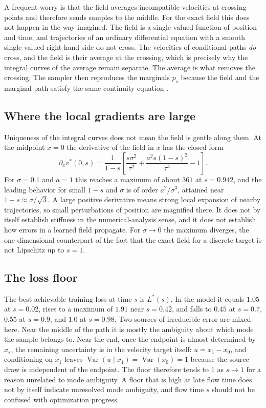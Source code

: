 \documentclass[11pt]{article}
\theoremstyle{definition}
\newcommand{\Var}{\operatorname{Var}}
\begin{document}
A frequent worry is that the field averages incompatible velocities at crossing points and therefore sends samples to the middle. For the exact field this does not happen in the way imagined. The field is a single-valued function of position and time, and trajectories of an ordinary differential equation with a smooth single-valued right-hand side do not cross. The velocities of conditional paths \emph{do} cross, and the field is their average at the crossing, which is precisely why the integral curves of the average remain separate. The average is what removes the crossing. The sampler then reproduces the marginals $p_s$ because the field and the marginal path satisfy the same continuity equation \citep{lipman2023}.

\subsection{Where the local gradients are large}

Uniqueness of the integral curves does not mean the field is gentle along them. At the midpoint $x=0$ the derivative of the field in $x$ has the closed form
\[
\partial_x v^\ast(0,s)=\frac{1}{1-s}\left[\frac{s\sigma^2}{\tau^2}+\frac{a^2 s(1-s)^2}{\tau^4}-1\right].
\]
For $\sigma=0.1$ and $a=1$ this reaches a maximum of about $361$ at $s=0.942$, and the leading behavior for small $1-s$ and $\sigma$ is of order $a^2/\sigma^3$, attained near $1-s\approx\sigma/\sqrt3$. A large positive derivative means strong local expansion of nearby trajectories, so small perturbations of position are magnified there. It does not by itself establish stiffness in the numerical-analysis sense, and it does not establish how errors in a learned field propagate. For $\sigma\to0$ the maximum diverges, the one-dimensional counterpart of the fact that the exact field for a discrete target is not Lipschitz up to $s=1$.

\subsection{The loss floor}

The best achievable training loss at time $s$ is $L^\ast(s)$. In the model it equals $1.05$ at $s=0.02$, rises to a maximum of $1.91$ near $s=0.42$, and falls to $0.45$ at $s=0.7$, $0.55$ at $s=0.9$, and $1.0$ at $s=0.98$. Two sources of irreducible error are mixed here. Near the middle of the path it is mostly the ambiguity about which mode the sample belongs to. Near the end, once the endpoint is almost determined by $x_s$, the remaining uncertainty is in the velocity target itself: $u=x_1-x_0$, and conditioning on $x_1$ leaves $\Var(u\mid x_1)=\Var(x_0)=1$ because the source draw is independent of the endpoint. The floor therefore tends to $1$ as $s\to1$ for a reason unrelated to mode ambiguity. A floor that is high at late flow time does not by itself indicate unresolved mode ambiguity, and flow time $s$ should not be confused with optimization progress.
\end{document}
